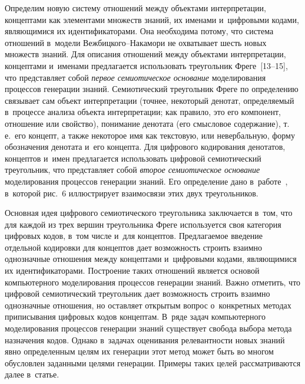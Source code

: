 {\begin{multicols}{2}
      Определим новую систему отношений между объектами интерпретации, концептами 
как эле\-мен\-тами множеств знаний, их именами и~цифро\-вы\-ми кодами, являющимися их 
идентифика\-торами. Она необходима потому, что система отношений в~модели  
Веж\-биц\-ко\-го--На\-ка\-мо\-ри не охватывает шесть новых множеств знаний. Для 
описания отношений между объектами интерпретации, концептами и~именами предлагается 
использовать треугольник Фреге~[13--15], что представляет собой 
\textit{первое семиотическое основание} моделирования процессов генерации знаний. 
Семиотический треугольник Фреге по определению связывает сам объект интерпретации 
(точнее, некоторый денотат, определяемый в~процессе анализа объекта интерпретации; как 
правило, это его компонент, отношение или свойство), понимание денотата (его смысловое 
содержание), т.\,е.\ его концепт, а также некоторое имя как текстовую, или невербальную, 
форму обозначения денотата и~его концепта. Для циф\-ро\-вого кодирования денотатов, 
концептов и~имен предлагается использовать циф\-ро\-вой семиотический треугольник, что 
представляет собой \textit{второе семиотическое основание} моделирования процессов 
генерации знаний. Его определение дано в~работе~\cite{16-zat}, в~которой рис.~6 
иллюстрирует взаимосвязи этих двух треугольников.
   
   Основная идея цифрового семиотического треугольника заключается в~том, что для 
каждой из трех вершин треугольника Фреге используется своя категория цифровых кодов, 
в~том числе и~для концептов. Предлагаемое введение отдельной кодировки для концептов 
дает возможность строить взаимно однозначные отношения между концептами 
и~циф\-ро\-вы\-ми кодами, являющимися их идентификаторами. Построение таких отношений 
является основой компьютерного моделирования процессов генерации знаний. Важно 
отметить, что циф\-ро\-вой семиотический треугольник дает возможность строить взаимно 
однозначные отношения, но остав\-ля\-ет открытым вопрос о~конкретных методах 
приписывания цифровых кодов концептам. В~ряде задач компьютерного моделирования 
процессов генерации знаний существует свобода выбора метода назначения кодов. Однако 
в~задачах оценивания релевантности новых знаний явно определенным целям их генерации 
этот метод может быть во многом обусловлен заданными целями генерации. Примеры 
таких целей рассматриваются далее в~статье.
      

\end{multicols}}
